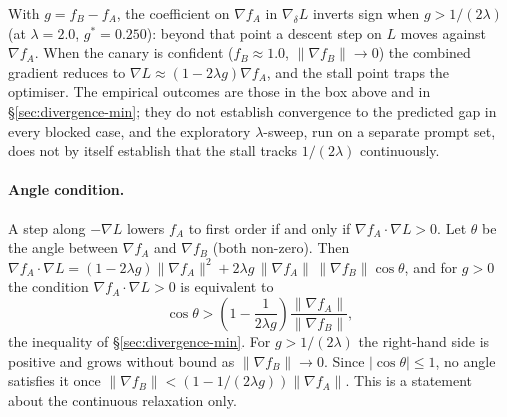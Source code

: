 \documentclass{article}
\begin{document}
\noindent{}\medskip

With $g = f_B - f_A$, the coefficient on $\nabla f_A$ in $\nabla_\delta L$ inverts sign when $g > 1/(2\lambda)$ (at $\lambda = 2.0$, $g^* = 0.250$): beyond that point a descent step on $L$ moves against $\nabla f_A$. When the canary is confident ($f_B \approx 1.0$, $\|\nabla f_B\| \to 0$) the combined gradient reduces to $\nabla L \approx (1 - 2\lambda g)\nabla f_A$, and the stall point traps the optimiser. The empirical outcomes are those in the box above and in \S\ref{sec:divergence-min}; they do not establish convergence to the predicted gap in every blocked case, and the exploratory $\lambda$-sweep, run on a separate prompt set, does not by itself establish that the stall tracks $1/(2\lambda)$ continuously.

\paragraph{Angle condition.} A step along $-\nabla L$ lowers $f_A$ to first order if and only if $\nabla f_A\cdot\nabla L > 0$. Let $\theta$ be the angle between $\nabla f_A$ and $\nabla f_B$ (both non-zero). Then $\nabla f_A\cdot\nabla L = (1-2\lambda g)\|\nabla f_A\|^2 + 2\lambda g\,\|\nabla f_A\|\,\|\nabla f_B\|\cos\theta$, and for $g > 0$ the condition $\nabla f_A\cdot\nabla L > 0$ is equivalent to
\[
\cos\theta > \left(1 - \frac{1}{2\lambda g}\right)\frac{\|\nabla f_A\|}{\|\nabla f_B\|},
\]
the inequality of \S\ref{sec:divergence-min}. For $g > 1/(2\lambda)$ the right-hand side is positive and grows without bound as $\|\nabla f_B\| \to 0$. Since $|\cos\theta| \le 1$, no angle satisfies it once $\|\nabla f_B\| < (1 - 1/(2\lambda g))\|\nabla f_A\|$. This is a statement about the continuous relaxation only.
\end{document}
